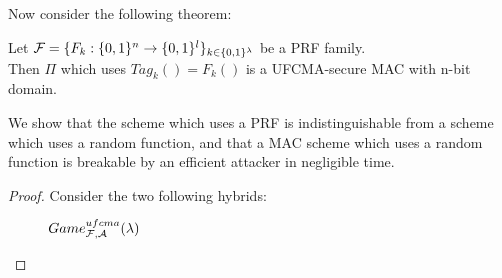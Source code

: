 Now consider the following theorem:
\begin{theorem}
    Let $\mathcal{F}=\{F_{k}:\{0,1\}^{n} \to \{0,1\}^{l}\}_{k \in \{0,1\}^{\lambda}}$ 
    be a PRF family.\\
    Then $\Pi$ which uses $Tag_{k}()=F_{k}()$ is a UFCMA-secure
    MAC with n-bit domain.
\end{theorem}
We show that the scheme which uses a PRF is indistinguishable from a scheme
which uses a random function, and that a MAC scheme which uses a random function
is breakable by an efficient attacker in negligible time.
\begin{proof}
Consider the two following hybrids:

\begin{figure}[h!]
   \centering
   \sdinit{}
   \caption{$Game_{\mathcal{F}, \mathcal{A}}^{ufcma}(\lambda)$}
\end{figure}

\begin{figure}[h!]
   \centering
   \sdinit{}
\end{figure}
\end{proof}
